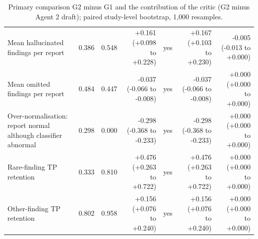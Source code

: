 \begin{table}[t]
\begin{tabular}{lrrrrrr}
Mean hallucinated findings per report & 0.386 & 0.548 & +0.161 (+0.098 to +0.228) & yes & +0.167 (+0.103 to +0.230) & -0.005 (-0.013 to +0.000) \\
Mean omitted findings per report & 0.484 & 0.447 & -0.037 (-0.066 to -0.008) & yes & -0.037 (-0.066 to -0.008) & +0.000 (+0.000 to +0.000) \\
Over-normalisation: report normal although classifier abnormal & 0.298 & 0.000 & -0.298 (-0.368 to -0.233) & yes & -0.298 (-0.368 to -0.233) & +0.000 (+0.000 to +0.000) \\
Rare-finding TP retention & 0.333 & 0.810 & +0.476 (+0.263 to +0.722) & yes & +0.476 (+0.263 to +0.722) & +0.000 (+0.000 to +0.000) \\
Other-finding TP retention & 0.802 & 0.958 & +0.156 (+0.076 to +0.240) & yes & +0.156 (+0.076 to +0.240) & +0.000 (+0.000 to +0.000) \\
\hline
\end{tabular}
\caption{Primary comparison G2 minus G1 and the contribution of the critic (G2 minus Agent 2 draft); paired study-level bootstrap, 1,000 resamples.}
\label{tab:table3_paired_bootstrap_differences}
\end{table}
